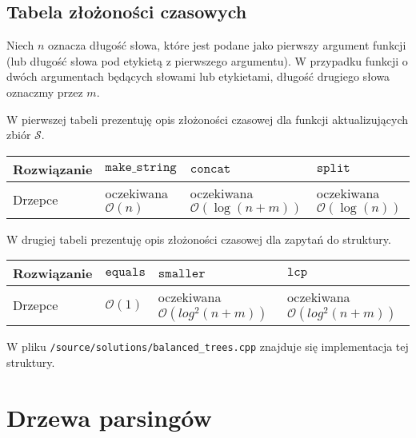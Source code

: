 \documentclass[declaration,shortabstract]{iithesis}
\theoremstyle{definition} \newtheorem{definition}{Definicja}[chapter]
\theoremstyle{remark} \newtheorem{remark}[definition]{Obserwacja}
\theoremstyle{plain} \newtheorem{theorem}[definition]{Twierdzenie}
\theoremstyle{remark} \newtheorem{example}{Przykład}[definition]
\theoremstyle{plain} \newtheorem{lemma}[definition]{Lemat}
\begin{document}
\subsection{Tabela złożoności czasowych}

Niech $n$ oznacza długość słowa, które jest podane jako pierwszy argument funkcji (lub długość słowa pod etykietą z pierwszego argumentu). W przypadku funkcji o dwóch argumentach będących słowami lub etykietami, długość drugiego słowa oznaczmy przez $m$.

W pierwszej tabeli prezentuję opis złożoności czasowej dla funkcji aktualizujących zbiór $\mathcal{S}$.

\begin{center}
    \begin{tabular}{ | m{3cm} | >{\centering\arraybackslash}m{3cm} | >{\centering\arraybackslash}m{3cm} | >{\centering\arraybackslash}m{3cm} | }
        \hline 
        Rozwiązanie & $\texttt{make\_string}$ & $\texttt{concat}$ & $\texttt{split}$ \\
        \hline
        Drzepce & oczekiwana $\mathcal{O}(n)$ & oczekiwana $\mathcal{O}(\log(n + m))$ & oczekiwana $\mathcal{O}(\log(n))$ \\
        \hline
    \end{tabular}
\end{center}

W drugiej tabeli prezentuję opis złożoności czasowej dla zapytań do struktury.

\begin{center}
    \begin{tabular}{ | m{3cm} | >{\centering\arraybackslash}m{3cm} | >{\centering\arraybackslash}m{3cm} | >{\centering\arraybackslash}m{3cm} | }
        \hline 
        Rozwiązanie & $\texttt{equals}$ & $\texttt{smaller}$ & $\texttt{lcp}$ \\
        \hline
        Drzepce & $\mathcal{O}(1)$ & oczekiwana $\mathcal{O}(log^2(n + m))$ & oczekiwana $\mathcal{O}(log^2(n + m))$ \\
        \hline
    \end{tabular}
\end{center}

W pliku \texttt{/source/solutions/balanced\_trees.cpp} znajduje się implementacja tej struktury.

\section{Drzewa parsingów}
\end{document}
